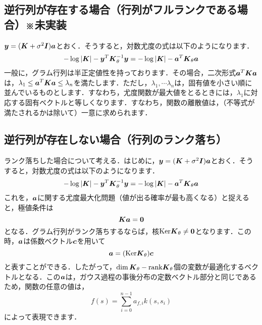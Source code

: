 \documentclass[11pt]{jsarticle}
\begin{document}
		\subsection{逆行列が存在する場合（行列がフルランクである場合）※未実装}
			$ \boldsymbol{y} = (\boldsymbol{K} + \sigma^2 \boldsymbol{I}) \boldsymbol{a} $とおく．そうすると，対数尤度の式は以下のようになります．
			\begin{equation}\label{key2}
			-\log|\boldsymbol{K}| - \boldsymbol{y}^T \boldsymbol{K}_{\theta}^{-1} \boldsymbol{y} = -\log|\boldsymbol{K}| - \boldsymbol{a}^T \boldsymbol{K}_{\theta} \boldsymbol{a} 
			\end{equation}
			一般に，グラム行列は半正定値性を持っております．その場合，二次形式$ \boldsymbol{a}^T \boldsymbol{K} \boldsymbol{a} $は，$ \lambda_1 \leq \boldsymbol{a}^T \boldsymbol{K} \boldsymbol{a} \leq \lambda_n $を満たします．ただし，$ \lambda_1,\cdots \lambda_n $は，固有値を小さい順に並んでいるものとします．すなわち，尤度関数が最大値をとるときには，$ \lambda_1 $に対応する固有ベクトルと等しくなります．すなわち，関数の離散値は，（不等式が満たされるかは除いて）一意に求められます．
		\subsection{逆行列が存在しない場合（行列のランク落ち）}
			ランク落ちした場合について考える．はじめに，$ \boldsymbol{y} = (\boldsymbol{K} + \sigma^2 \boldsymbol{I}) \boldsymbol{a} $とおく．そうすると，対数尤度の式は以下のようになります．
			\begin{equation}\label{key}
				-\log|\boldsymbol{K}| - \boldsymbol{y}^T \boldsymbol{K}_{\theta}^{-1} \boldsymbol{y} = -\log|\boldsymbol{K}| - \boldsymbol{a}^T \boldsymbol{K}_{\theta} \boldsymbol{a} 
			\end{equation}
			これを，$ \boldsymbol{a} $に関する尤度最大化問題（値が出る確率が最も高くなる）と捉えると，極値条件は
			\begin{equation}\label{eq:EX_COND}
				\boldsymbol{K} \boldsymbol{a} = \boldsymbol{0}
			\end{equation}
			となる．グラム行列がランク落ちするならば，核$ {\rm Ker} \boldsymbol{K}_{\theta}  \neq \boldsymbol{0} $となります．この時，$ \boldsymbol{a} $は係数ベクトル$ \boldsymbol{c} $を用いて
			\begin{equation}\label{eq:Aeq}
				\boldsymbol{a} = ({\rm Ker} \boldsymbol{K}_{\theta} ) \boldsymbol{c}
			\end{equation}
			と表すことができる．したがって，$ \dim \boldsymbol{K}_{\theta} - {\rm rank} \boldsymbol{K}_{\theta} $個の変数が最適化するベクトルとなる．この$ \boldsymbol{a} $は，ガウス過程の事後分布の定数ベクトル部分と同じであるため，関数の任意の値は，
			\begin{equation}\label{eq:Dist_eq}
				f(s) = \sum_{i=0}^{n-1} a_{f,i} k(s,s_i)
			\end{equation}
			によって表現できます．
\end{document}
